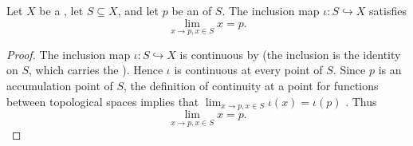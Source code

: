 \begin{corollary} \label{corollary:limit_of_inclusion_map_into_topological_space_at_accumulation_point}
    Let $X$ be a , let $S \subseteq X$, and let $p$ be an  of $S$. The inclusion map $\iota : S \hookrightarrow X$ satisfies
    $$\lim_{x \to p, x \in S} x = p.$$
\end{corollary}
\begin{proof}
    The inclusion map $\iota : S \hookrightarrow X$ is continuous by  (the inclusion is the identity on $S$, which carries the ). Hence $\iota$ is continuous at every point of $S$. Since $p$ is an accumulation point of $S$, the definition of continuity at a point for functions between topological spaces implies that $\lim_{x \to p, x \in S} \iota(x) = \iota(p)$ . Thus
    $$\lim_{x \to p, x \in S} x = p.$$
\end{proof}
